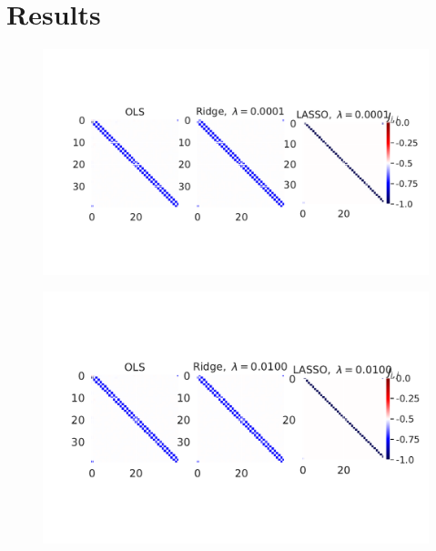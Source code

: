 \section{Results}
\begin{figure}[H]
\includegraphics[width = 0.7\paperwidth]{figures/regression_mehta_1.pdf}
\end{figure}
\begin{figure}[H]
\includegraphics[width = 0.7\paperwidth]{figures/regression_mehta_3.pdf}\\
\end{figure}
